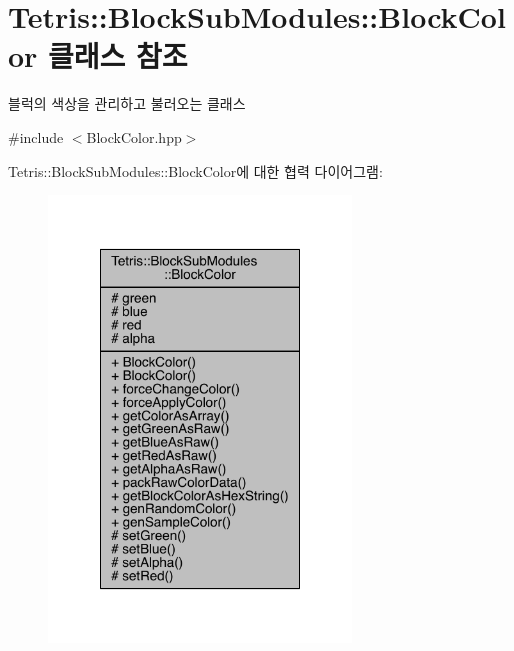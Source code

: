 \hypertarget{class_tetris_1_1_block_sub_modules_1_1_block_color}{}\section{Tetris\+:\+:Block\+Sub\+Modules\+:\+:Block\+Color 클래스 참조}
\label{class_tetris_1_1_block_sub_modules_1_1_block_color}


블럭의 색상을 관리하고 불러오는 클래스  




{\ttfamily \#include $<$Block\+Color.\+hpp$>$}



Tetris\+:\+:Block\+Sub\+Modules\+:\+:Block\+Color에 대한 협력 다이어그램\+:
\nopagebreak
\begin{figure}[H]
\begin{center}
\leavevmode
\includegraphics[width=228pt]{class_tetris_1_1_block_sub_modules_1_1_block_color__coll__graph}
\end{center}
\end{figure}
